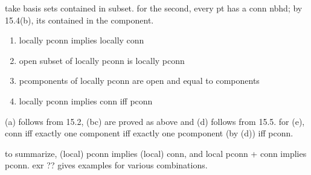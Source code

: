 \begin{pf}[source=Primary Source Material]
    take basis sets contained in subset.
    for the second, every pt has a conn nbhd;
    by 15.4(b), its contained in the component.
\end{pf}

\begin{prop}
    \vspace{-0.375in}
    \begin{enumerate}[(\alph*)]
        \item locally pconn implies locally conn
        \item open subset of locally pconn is locally pconn
        \item pcomponents of locally pconn are open and equal to components
        \item locally pconn implies conn iff pconn
    \end{enumerate}
    \vspace{-0.1in}
\end{prop}

\begin{pf}[source=Primary Source Material]
    (a) follows from 15.2, (bc) are proved as above and (d) follows from 15.5.
    for (e), conn iff exactly one component iff exactly one pcomponent (by (d))
    iff pconn.
\end{pf}

to summarize, (local) pconn implies (local) conn, and local pconn + conn
implies pconn. exr ?? gives examples for various combinations.

